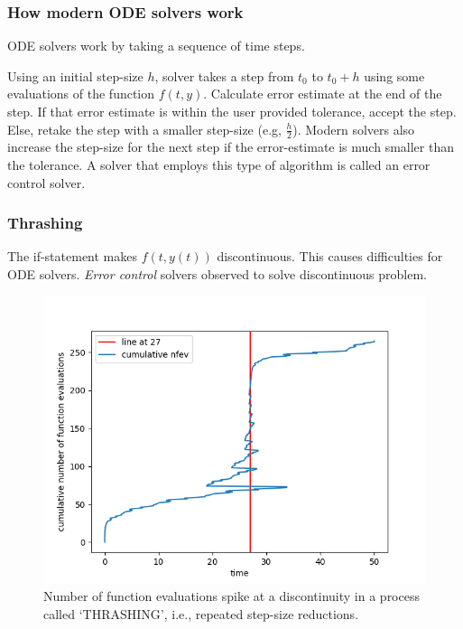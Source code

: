 \documentclass{beamer}
\begin{document}
\begin{frame}
\frametitle{How modern ODE solvers work}
ODE solvers work by taking a sequence of time steps.

Using an initial step-size $h$, solver takes a step from $t_0$ to $t_0 + h$ using some evaluations of the function $f(t, y)$. 
\newline \newline
Calculate error estimate at the end of the step.
If that error estimate is within the user provided tolerance, accept the step.
Else, retake the step with a smaller step-size (e.g, $\frac{h}{2}$).
\newline \newline
Modern solvers also increase the step-size for the next step if the error-estimate is much smaller than the tolerance.
\newline \newline
A solver that employs this type of algorithm is called an error control solver.
\end{frame}

\begin{frame}
\frametitle{Thrashing}
The if-statement makes $f(t, y(t))$ discontinuous.
This causes difficulties for ODE solvers.
\emph{Error control} solvers observed to solve discontinuous problem.
\begin{figure}[H]
\centering
\includegraphics[width=0.7\linewidth]{./figures/ode_thrashing}
\caption{Number of function evaluations spike at a discontinuity in a process called `THRASHING', i.e., repeated step-size reductions.}
\label{fig:ode_thrashing}
\end{figure}
\end{frame}
\end{document}
